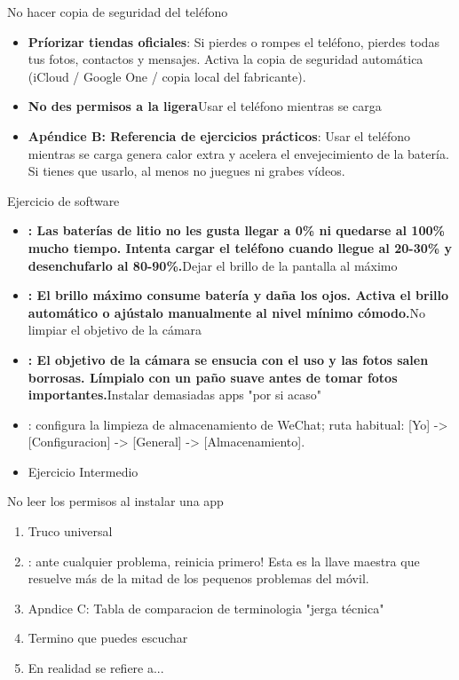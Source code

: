 No hacer copia de seguridad del teléfono

\begin{itemize}
  \item \textbf{Príorizar tiendas oficiales}: Si pierdes o rompes el teléfono, pierdes todas tus fotos, contactos y mensajes. Activa la copia de seguridad automática (iCloud / Google One / copia local del fabricante).
  \item \textbf{No des permisos a la ligera}Usar el teléfono mientras se carga
  \item \textbf{Apéndice B: Referencia de ejercicios prácticos}: Usar el teléfono mientras se carga genera calor extra y acelera el envejecimiento de la batería. Si tienes que usarlo, al menos no juegues ni grabes vídeos.
\end{itemize}


Ejercicio de software

\begin{itemize}
  \item \textbf{: Las baterías de litio no les gusta llegar a 0\% ni quedarse al 100\% mucho tiempo. Intenta cargar el teléfono cuando llegue al 20-30\% y desenchufarlo al 80-90\%.}Dejar el brillo de la pantalla al máximo
  \item \textbf{: El brillo máximo consume batería y daña los ojos. Activa el brillo automático o ajústalo manualmente al nivel mínimo cómodo.}No limpiar el objetivo de la cámara
  \item \textbf{: El objetivo de la cámara se ensucia con el uso y las fotos salen borrosas. Límpialo con un paño suave antes de tomar fotos importantes.}Instalar demasiadas apps "por si acaso"
  \item : configura la limpieza de almacenamiento de WeChat; ruta habitual: [Yo] -> [Configuracion] -> [General] -> [Almacenamiento].
  \item Ejercicio Intermedio
\end{itemize}


No leer los permisos al instalar una app

\begin{enumerate}
  \item Truco universal
  \item : ante cualquier problema, reinicia primero! Esta es la llave maestra que resuelve más de la mitad de los pequenos problemas del móvil.
  \item Apndice C: Tabla de comparacion de terminologia "jerga técnica"
  \item Termino que puedes escuchar
  \item En realidad se refiere a...
\end{enumerate}

